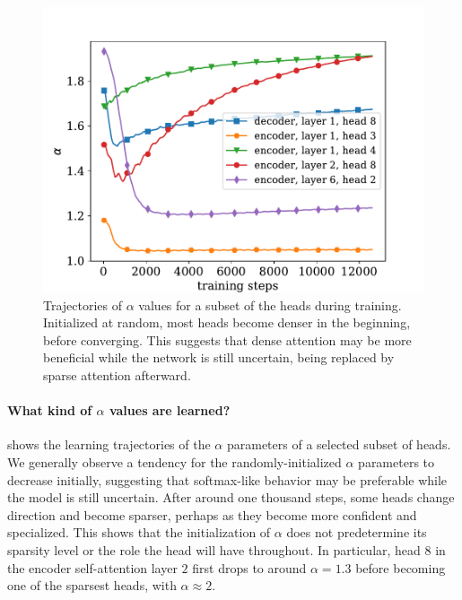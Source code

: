 \begin{figure}[ht]
    \centering
    \includegraphics[width=0.95\columnwidth]{Figures/learning_alpha.pdf}
    \caption[Trajectories of $\alpha$ values for a subset of the heads during
        training.]{\label{fig:learning_alpha}
        Trajectories of $\alpha$ values for a subset of the heads during
        training. Initialized at random, most heads become denser in the
        beginning, before converging. This suggests that dense attention may
        be more beneficial while the network is still uncertain, being
        replaced by sparse attention afterward.}
\end{figure}

\paragraph*{What kind of {\boldmath $\alpha$} values are learned?}
 shows the learning trajectories of the
$\alpha$ parameters of a selected subset of heads. We generally
observe a tendency for the randomly-initialized $\alpha$ parameters
to decrease initially, suggesting that softmax-like behavior may be
preferable while the model is still uncertain. After around one
thousand steps, some heads change direction and become sparser,
perhaps as they become more confident and specialized. This shows
that the initialization of $\alpha$ does not predetermine its
sparsity level or the role the head will have throughout. In
particular, head $8$ in the encoder self-attention layer $2$ first
drops to around $\alpha=1.3$ before becoming one of the sparsest
heads, with $\alpha\approx2$.

